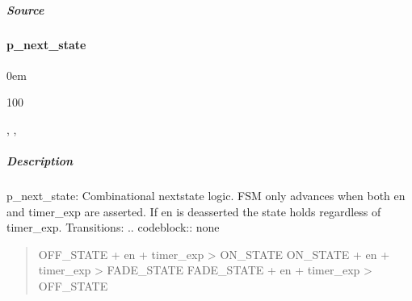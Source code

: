 \documentclass[letterpaper,10pt,english]{sphinxmanual}
\begin{document}
\subparagraph{Source}
\label{\detokenize{modules/blinky/processes/p_state_reg:source}}
\begin{sphinxVerbatim}[commandchars=\\\{\}]
\end{sphinxVerbatim}

\sphinxstepscope


\paragraph{p\_next\_state}
\label{\detokenize{modules/blinky/processes/p_next_state:p-next-state}}\label{\detokenize{modules/blinky/processes/p_next_state::doc}}
\begin{DUlineblock}{0em}
\item[]  
\item[]  100
\item[]  
\item[]  , , 
\end{DUlineblock}


\subparagraph{Description}
\label{\detokenize{modules/blinky/processes/p_next_state:description}}
\sphinxAtStartPar
p\_next\_state: Combinational next\sphinxhyphen{}state logic.
FSM only advances when both en and timer\_exp are asserted.
If en is deasserted the state holds regardless of timer\_exp.
Transitions:
.. code\sphinxhyphen{}block:: none
\begin{quote}

\sphinxAtStartPar
OFF\_STATE  + en + timer\_exp \sphinxhyphen{}\textgreater{} ON\_STATE
ON\_STATE   + en + timer\_exp \sphinxhyphen{}\textgreater{} FADE\_STATE
FADE\_STATE + en + timer\_exp \sphinxhyphen{}\textgreater{} OFF\_STATE
\end{quote}
\end{document}
